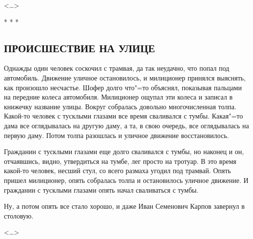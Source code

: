 \documentclass{article}
\begin{document}
\begin{flushright}<\dots>\end{flushright}

\begin{center}* * *\end{center}

\begin{center}\subsection*{\textbf{ПРОИСШЕСТВИЕ НА УЛИЦЕ}}\end{center}

Однажды один человек соскочил с трамвая, да так  неудачно, что попал под автомобиль. Движение уличное остановилось, и милиционер принялся выяснять, как произошло несчастье. Шофер долго что"=то объяснял, показывая пальцами на передние колеса автомобиля. Милиционер ощупал эти колеса и записал в книжечку название улицы. Вокруг собралась довольно многочисленная толпа. Какой-то человек с тусклыми глазами все время сваливался с тумбы. Какая"=то дама все оглядывалась на другую даму, а та, в свою очередь, все оглядывалась на первую даму. Потом толпа разошлась и уличное движение восстановилось.

Гражданин с тусклыми  глазами еще долго сваливался с тумбы, но наконец и он, отчаявшись, видно, утвердиться на тумбе, лег просто на тротуар. В это время какой-то человек, несший стул, со всего  размаха  угодил  под трамвай. Опять пришел милиционер, опять собралась толпа и остановилось  уличное движение.  И гражданин с тусклыми глазами  опять начал сваливаться с тумбы.

Ну, а  потом опять все стало хорошо, и даже Иван Семенович Карпов завернул в столовую.

\begin{flushright}<\dots>\end{flushright}
\end{document}
